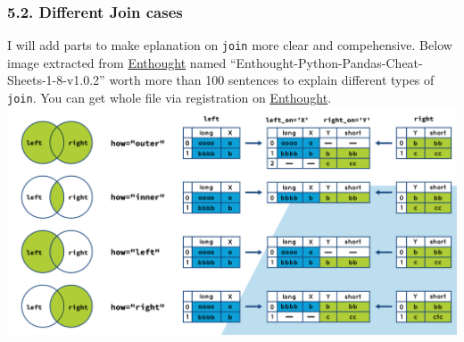 \documentclass[11pt]{article}
\begin{document}
    \hypertarget{different-join-cases}{%
\subsubsection{5.2. Different Join cases}\label{different-join-cases}}

I will add parts to make eplanation on \texttt{join} more clear and
compehensive. Below image extracted from
\href{https://www.enthought.com/}{Enthought} named
``Enthought-Python-Pandas-Cheat-Sheets-1-8-v1.0.2'' worth more than 100
sentences to explain different types of \texttt{join}. You can get whole
file via registration on \href{https://www.enthought.com/}{Enthought}.
\includegraphics{Join.png}
\end{document}
